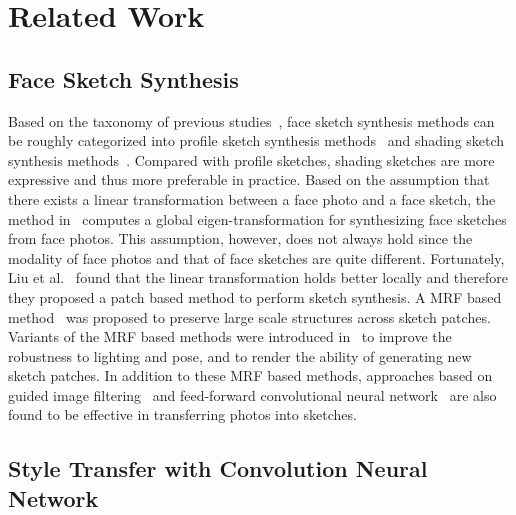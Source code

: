 \documentclass[10pt,twocolumn,letterpaper]{article}
\begin{document}
{
\section{Related Work}
}
{
\subsection{Face Sketch Synthesis}
}
Based on the taxonomy of previous studies~\cite{song2014real,zhou2012markov}, face sketch synthesis methods can be roughly categorized into profile sketch synthesis methods~\cite{berger2013style,chen2001example,xu2008hierarchical} and shading sketch synthesis methods~\cite{liu2005nonlinear,song2014real,tang2003face,wang2009face,zhang2015end,zhang2010lighting,zhou2012markov}. Compared with profile sketches, shading sketches are more expressive and thus more preferable in practice. Based on the assumption that there exists a linear transformation between a face photo and a face sketch, the method in~\cite{tang2003face} computes a global eigen-transformation for synthesizing face sketches from face photos. This assumption, however, does not always hold since the modality of face photos and that of face sketches are quite different. Fortunately, Liu et al.~\cite{liu2005nonlinear} found that the linear transformation holds better locally and therefore they proposed a patch based method to perform sketch synthesis. A MRF based method~\cite{wang2009face} was proposed to preserve large scale structures across sketch patches. Variants of the MRF based methods were introduced in~\cite{zhang2010lighting,zhou2012markov} to improve the robustness to lighting and pose, and to render the ability of generating new sketch patches. In addition to these MRF based methods, approaches based on guided image filtering~\cite{song2014real} and feed-forward convolutional neural network~\cite{zhang2015end} are also found to be effective in transferring photos into sketches.
{
\subsection{Style Transfer with Convolution Neural Network}
}
\end{document}
